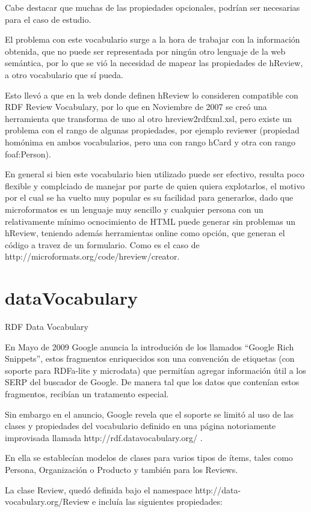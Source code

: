 Cabe destacar que muchas de las propiedades opcionales, podrían ser necesarias para el caso de estudio.

El problema con este vocabulario surge a la hora de trabajar con la información obtenida, que no puede ser representada por ningún otro 
lenguaje de la web semántica, por lo que se vió la necesidad de mapear las propiedades de hReview, a otro vocabulario que sí pueda.

Esto llevó a que en la web donde definen hReview lo consideren compatible con RDF Review Vocabulary, por lo que en Noviembre de 2007 
se creó una herramienta que transforma de uno al otro hreview2rdfxml.xsl,  pero existe un problema con el rango de algunas 
propiedades, por ejemplo reviewer (propiedad homónima en ambos vocabularios, pero una con rango hCard y otra con rango foaf:Person).

En general si bien este vocabulario bien utilizado puede ser efectivo, resulta poco flexible y complciado de manejar por parte 
de quien quiera explotarlos, el motivo por el cual se ha vuelto muy popular es su facilidad para generarlos, dado que 
microformatos es un lenguaje muy sencillo y cualquier persona con un relativamente mínimo ocnocimiento de HTML puede generar 
sin problemas un hReview, teniendo además herramientas online como opción, que generan el código a travez de un formulario. 
Como es el caso de http://microformats.org/code/hreview/creator. 


\section{dataVocabulary}
RDF Data Vocabulary

En Mayo de 2009 Google anuncia la introdución de los llamados ``Google Rich Snippets'', estos fragmentos enriquecidos son una convención 
de etiquetas (con soporte para RDFa-lite y microdata) que permitían agregar información útil a los SERP del buscador de Google. De manera tal 
que los datos que contenían estos fragmentos, recibían un tratamento especial.

Sin embargo en el anuncio, Google revela que el soporte se limitó al uso de las clases y propiedades del vocabulario definido en una página 
notoriamente improvisada llamada http://rdf.datavocabulary.org/ . 

En ella se establecían modelos de clases para varios tipos de ítems, tales como Persona, Organización o Producto y también para los Reviews.

La clase Review, quedó definida bajo el namespace http://data-vocabulary.org/Review e incluía las siguientes propiedades:

